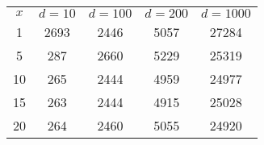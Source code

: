 \begin{tabular}{ccccc}
\hline
 $x$ & $d=10$ & $d=100$ & $d=200$ & $d=1000$ \\
 1 &2693 &2446 &5057 &27284\\
 5 &287 &2660 &5229 &25319\\
10 &265 &2444 &4959 &24977\\
15 &263 &2444 &4915 &25028\\
20 &264 &2460 &5055 &24920\\
\hline
\end{tabular}
